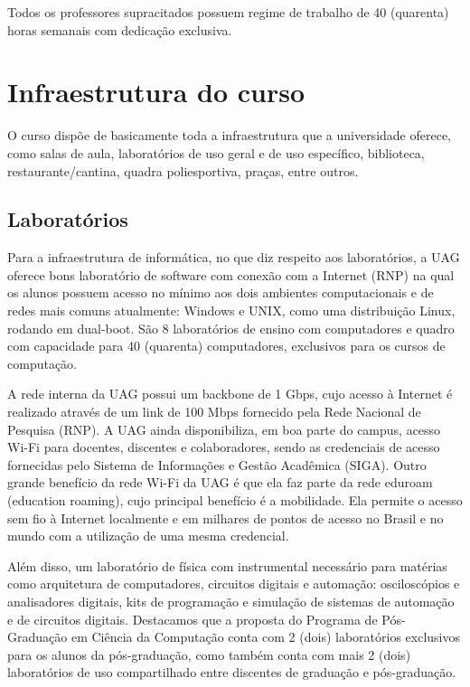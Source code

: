 \documentclass[
	12pt,				%
	openright,			%
  oneside,     %
	a4paper,			%
 hyphens,
	chapter=TITLE,		%
	english,			%
	french,				%
	spanish,			%
	brazil				%
	]{abntex2}
\begin{document}
Todos os professores supracitados possuem regime de trabalho de 40 (quarenta) horas semanais com dedicação exclusiva.





%
%




\chapter{Infraestrutura do curso}

O curso dispõe de basicamente toda a infraestrutura que a universidade oferece, como salas de aula, laboratórios de uso geral e de uso específico, biblioteca, restaurante/cantina, quadra poliesportiva, praças, entre outros. 


\section{Laboratórios}

Para a infraestrutura de informática, no que diz respeito aos laboratórios, a UAG oferece bons laboratório de software com conexão com a Internet (RNP) na qual os alunos possuem acesso no mínimo aos dois ambientes computacionais e de redes mais comuns atualmente: Windows e UNIX, como uma distribuição Linux, rodando em dual-boot. São 8 laboratórios de ensino com computadores e quadro com capacidade para 40 (quarenta) computadores, exclusivos para os cursos de computação.

A rede interna da UAG possui um backbone de 1 Gbps, cujo acesso à Internet é realizado através de um link de 100 Mbps fornecido pela Rede Nacional de Pesquisa (RNP). A UAG ainda disponibiliza, em boa parte do campus, acesso Wi-Fi para docentes, discentes e colaboradores, sendo as credenciais de acesso fornecidas pelo Sistema de Informações e Gestão Acadêmica (SIGA). Outro grande benefício da rede Wi-Fi da UAG é que ela faz parte da rede eduroam (education roaming), cujo principal benefício é a mobilidade. Ela permite o acesso sem fio à Internet localmente e em milhares de pontos de acesso no Brasil e no mundo com a utilização de uma mesma credencial.

Além disso, um laboratório de física com  instrumental necessário para matérias como arquitetura de computadores, circuitos digitais e automação: osciloscópios e analisadores digitais, kits de programação e simulação de sistemas de automação e de circuitos digitais. Destacamos que a proposta do Programa de Pós-Graduação em Ciência da Computação conta com 2 (dois) laboratórios exclusivos para os alunos da pós-graduação, como também conta com mais 2 (dois) laboratórios de uso compartilhado entre discentes de graduação e pós-graduação.
\end{document}
